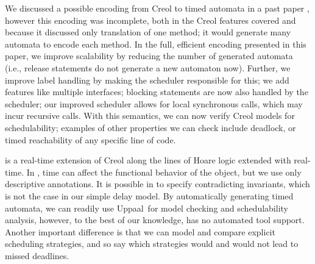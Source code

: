 \documentclass[copyright,creativecommons]{eptcs}
\theoremstyle{definition}
\newcommand{\Uppaal}{{\sc Uppaal}\xspace}
\begin{document}
We discussed a possible encoding from Creol to timed automata in a past paper \cite{fsen09}, however this encoding was incomplete, both in the Creol features covered and because it discussed only translation of one method; it would generate  many automata to encode each method.
In the full, efficient encoding presented in this paper, we improve scalability by reducing the number of generated automata (i.e., release statements do not generate a new automaton now). Further, we improve label handling by making the scheduler responsible for this; we add features like multiple interfaces; blocking statements are now also handled by the scheduler; our improved scheduler allows for local synchronous calls, which may incur recursive calls. With this semantics, we can now verify Creol models for schedulability; examples of other properties we can check include deadlock, or timed reachability of any specific line of code.


 \cite{KyasJ08} is a real-time extension of Creol along the lines of   Hoare logic extended with real-time.
In , time can affect the functional behavior of the object, but we use only descriptive annotations.
It is possible in  to specify contradicting invariants, which is not the case in our simple delay model.
By automatically generating timed automata, we can readily use \Uppaal\ for model checking and schedulability analysis, however, to the best of our knowledge,  has no automated tool support.
Another important difference is that we can model and compare explicit scheduling strategies, and so say which strategies would and would not lead to missed deadlines.
\end{document}
